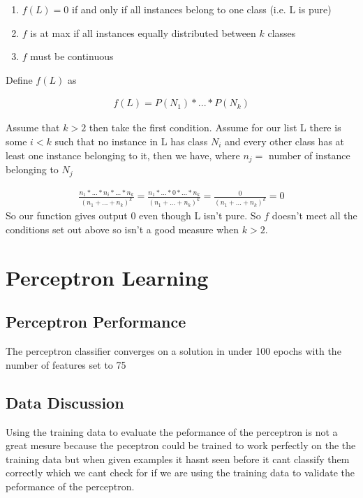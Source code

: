 \documentclass[a4paper, 12pt]{article}
\begin{document}
			\begin{enumerate}
				\item $f(L) = 0$ if and only if all instances belong to one class (i.e. L is pure)
				
				\item $f$ is at max if all instances equally distributed between $k$ classes
				
				\item $f$ must be continuous
			\end{enumerate}		
			
			Define $f(L)$ as 
	
			\begin{align*}
				f(L) = P(N_1) * ... * P(N_k)
			\end{align*}						
			
			Assume that $k > 2$ then take the first condition. Assume for our list L there is some $i < k$ such that no instance in L has class $N_i$ and every other class has at least one instance belonging to it, then we have, where $n_j = $ number of instance belonging to $N_j$
			
			\begin{align*}
				\frac{n_1 * ... * n_i * ... * n_k}{(n_1 + ... + n_k)^k} = \frac{n_1 * ... * 0 * ... * n_k}{(n_1 + ... + n_k)^k} = \frac{0}{(n_1 + ... + n_k)^k} = 0
			\end{align*}				   			
			So our function gives output 0 even though L isn't pure. So $f$ doesn't meet all the conditions set out above so isn't a good measure when $k > 2$.
  			
  			
  \section{Perceptron Learning}
  	\subsection{Perceptron Performance}
		The perceptron classifier converges on a solution in under 100 epochs with the number of features set to 75 		
  		
  	\subsection{Data Discussion}
  		Using the training data to evaluate the peformance of the perceptron is not a great mesure because the peceptron could be trained to work perfectly on the the training data but when given examples it hasnt seen before it cant classify them correctly which we cant check for if we are using the training data to validate the peformance of the perceptron.
  		
\end{document}
